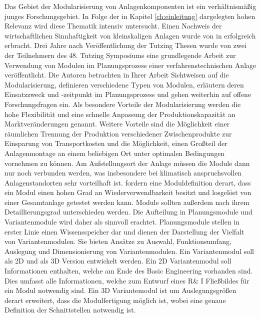 Das Gebiet der Modularisierung von Anlagenkomponenten ist ein verh\"altnism\"a\ss{}ig junges Forschungsgebiet. In Folge der in Kapitel \ref{ch:einleitung} dargelegten hohen Relevanz wird diese Thematik intensiv untersucht. \newline
Einen Nachweis der wirtschaftlichen Sinnhaftigkeit von kleinskaligen Anlagen wurde von \citeauthor{Seifert_2012} in  erfolgreich erbracht. \cite{Seifert_2012} \newline
Drei Jahre nach Ver\"offentlichung der Tutzing Thesen \cite{Processnet_2009} wurde von zwei der Teilnehmern des 48. Tutzing Symposiums eine grundlegende Arbeit zur Verwendung von Modulen im Planungsprozess einer verfahrenstechnischen Anlage ver\"offentlicht. Die Autoren \citeauthor{Bramsiepe_2012} betrachten in Ihrer Arbeit  \cite{Bramsiepe_2012} Sichtweisen auf die Modularisierung, definieren verschiedene Typen von Modulen, erl\"autern deren Einsatzzweck und -zeitpunkt im Planungsprozess und gehen weiterhin auf offene Forschungsfragen ein. \newline
Als besondere Vorteile der Modularisierung werden die hohe Flexibilit\"at und eine schnelle Anpassung der Produktionskapazit\"at an Marktver\"anderungen genannt. Weitere Vorteile sind die M\"oglichkeit einer r\"aumlichen Trennung der Produktion verschiedener  Zwischenprodukte zur Einsparung von Transportkosten und die M\"oglichkeit, einen Gro\ss{}teil der Anlagenmontage an einem beliebigen Ort unter optimalen Bedingungen vornehmen zu k\"onnen. Am Aufstellungsort der Anlage m\"ussen die Module dann nur noch verbunden werden, was insbesondere bei klimatisch anspruchsvollen Anlagenstandorten sehr vorteilhaft ist. \newline
\citeauthor{Bramsiepe_2012} fordern eine Moduldefinition derart, dass ein Modul einen hohen Grad an Wiederverwendbarkeit besitzt und losgel\"ost von einer Gesamtanlage getestet werden kann. Module sollten au\ss{}erdem nach ihrem Detaillierungsgrad unterschieden werden. Die Aufteilung in Planungsmodule und Variantenmodule wird daher als sinnvoll erachtet. Planungsmodule stellen in erster Linie einen Wissensspeicher dar und dienen der Darstellung der Vielfalt von Variantenmodulen. Sie bieten Ans\"atze zu Auswahl, Funktionsumfang, Auslegung und Dimensionierung von Variantenmodulen. Ein Variantenmodul soll als 2D und als 3D Version entwickelt werden. Ein 2D Variantenmodul soll Informationen enthalten, welche am Ende des Basic Engineering vorhanden sind. Dies umfasst alle Informationen, welche zum Entwurf eines R\& I Flie\ss{}bildes f\"ur ein Modul notwendig sind. Ein 3D Variantemodul ist um Auslegungsgr\"o\ss{}en derart erweitert, dass die Modulfertigung m\"oglich ist, wobei eine genaue Definition der Schnittstellen notwendig ist. \newline
